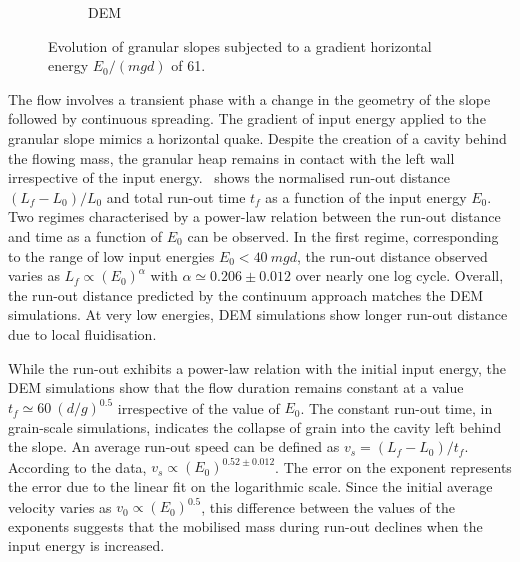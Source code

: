 \documentclass[3p,times,procedia,number]{elsarticle}
\begin{document}
\begin{figure}[tbph]
\begin{subfigure}[b]{0.42\textwidth}
    \caption{DEM}
    \label{fig:dem_gradvelocity_200j}
  \end{subfigure}
  \caption{Evolution of granular slopes subjected to a gradient
    horizontal energy $E_0/(mgd)$ of 61.}
  \label{fig:gradvelocity_200j}
\end{figure}


The flow involves a transient phase with a change in the geometry of the slope 
followed by continuous spreading. The gradient of input energy applied to the 
granular slope mimics a horizontal quake. Despite the creation of a cavity
behind the flowing mass, the granular heap remains in contact with the left
wall irrespective of the input energy.~ shows the
normalised run-out distance $(L_f - L_0)/L_0$ and total run-out time $t_f$ as a
function of the input energy $E_0$. Two regimes characterised by a power-law
relation between the run-out distance and time as a function of $E_0$ can be
observed. In the first regime, corresponding to the range of low input energies
$E_0 < 40 \ mgd$, the run-out distance observed varies as $L_f \propto
(E_0)^\alpha$ with $\alpha \simeq 0.206 \pm 0.012$ over nearly one log cycle.
Overall, the run-out distance predicted by the continuum approach matches the
DEM simulations. At very low energies, DEM simulations show longer run-out
distance due to local fluidisation.


While the run-out exhibits a power-law relation with the initial input energy, 
the DEM simulations show that the flow duration remains constant at a value  
$t_f \simeq 60 \  (d/g)^{0.5}$ irrespective of the value of $E_0$. The constant 
run-out time, in grain-scale simulations, indicates the collapse of grain into 
the cavity left behind the slope. An average run-out speed can be defined as 
$v_s = (L_f - L_0) / t_f$. According to the data, $v_s \propto 
(E_0)^{0.52\pm 0.012}$. The error on the exponent represents the error due to
the linear fit on the logarithmic scale. Since the initial average velocity
varies as $v_0 \propto (E_0)^{0.5}$, this difference between the values of the
exponents suggests that the mobilised mass during run-out declines when the
input energy is increased.
\end{document}
